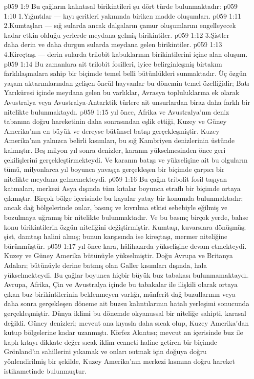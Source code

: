 \vs p059 1:9 Bu çağların kalıntısal birikintileri şu dört türde bulunmaktadır:
\vs p059 1:10 1.\bibnobreakspace Yığıntılar --- kıyı şeritleri yakınında biriken madde oluşumları.
\vs p059 1:11 2.\bibnobreakspace Kumtaşları --- sığ sularda ancak dalgaların çamur oluşumlarını engelleyecek kadar etkin olduğu yerlerde meydana gelmiş birikintiler.
\vs p059 1:12 3.\bibnobreakspace Şistler --- daha derin ve daha durgun sularda meydana gelen birikintiler.
\vs p059 1:13 4.\bibnobreakspace Kireçtaşı --- derin sularda trilobit kabuklarının birikintilerini içine alan oluşum.
\vs p059 1:14 Bu zamanlara ait trilobit fosilleri, iyice belirginleşmiş birtakım farklılaşmalara sahip bir biçimde temel belli bütünlükleri sunmaktadır. Üç özgün yaşam aktarımlarından gelişen öncül hayvanlar bu dönemin temel özelliğidir; Batı Yarıküresi içinde meydana gelen bu varlıklar, Avrasya topluluklarına ek olarak Avustralya veya Avustralya\hyp{}Antarktik türlere ait unsurlardan biraz daha farklı bir nitelikte bulunmaktaydı.
\vs p059 1:15  yıl önce, Afrika ve Avustralya’nın deniz tabanına doğru hareketinin daha sonrasından eşlik ettiği, Kuzey ve Güney Amerika’nın en büyük ve dereyse bütünsel batışı gerçekleşmiştir. Kuzey Amerika’nın yalnızca belirli kısımları, bu sığ Kambriyen denizlerinin üstünde kalmıştır. Beş milyon yıl sonra denizler, karanın yükselmesinden önce geri çekilişlerini gerçekleştirmekteydi. Ve karanın batışı ve yükselişine ait bu olguların tümü, milyonlarca yıl boyunca yavaşça gerçekleşen bir biçimde çarpıcı bir nitelikte meydana gelmemekteydi.
\vs p059 1:16 Bu çağın tribolit fosil taşıyan katmaları, merkezi Asya dışında tüm kıtalar boyunca etraflı bir biçimde ortaya çıkmıştır. Birçok bölge içerisinde bu kayalar yatay bir konumda bulunmaktadır; ancak dağ bölgelerinde onlar, basınç ve kıvrılma etkisi sebebiyle eğilmiş ve bozulmaya uğramış bir nitelikte bulunmaktadır. Ve bu basınç birçok yerde, bahse konu birikintilerin özgün niteliğini değiştirmiştir. Kumtaşı, kuvarslara dönüşmüş; şist, damtaşı halini almış; bunun karşısında ise kireçtaşı, mermer niteliğine bürünmüştür.
\vs p059 1:17  yıl önce kara, hâlihazırda yükselişine devam etmekteydi. Kuzey ve Güney Amerika bütünüyle yükselmiştir. Doğu Avrupa ve Britanya Adaları; bütünüyle derine batmış olan Galler kısımları dışında, hala yükselmekteydi. Bu çağlar boyunca hiçbir büyük buz tabakası bulunmamaktaydı. Avrupa, Afrika, Çin ve Avustralya içinde bu tabakalar ile ilişkili olarak ortaya çıkan buz birikintilerinin beklenmeyen varlığı, münferit dağ buzullarının veya daha sonra gerçekleşen döneme ait buzsu kalıntılarının hatalı yerleşimi sonucunda gerçekleşmiştir. Dünya iklimi bu dönemde okyanussal bir niteliğe sahipti, karasal değildi. Güney denizleri; mevcut ana kıyasla daha sıcak olup, Kuzey Amerika’dan kutup bölgelerine kadar uzanmıştı. Körfez Akıntısı; mevcut an içerisinde buz ile kaplı kıtayı dikkate değer sıcak iklim cenneti haline getiren bir biçimde Grönland’ın sahillerini yıkamak ve onları ısıtmak için doğuya doğru yönlendirilmiş bir şekilde, Kuzey Amerika'nın merkezi kısmına doğru hareket istikametinde bulunmuştur.
